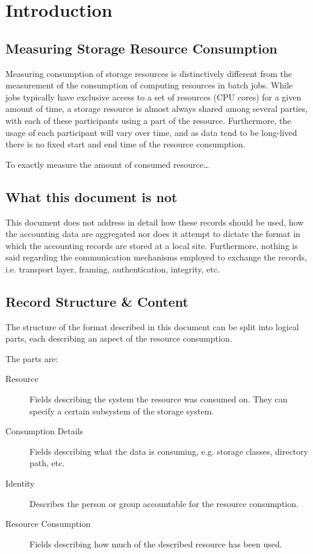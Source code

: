 \section{Introduction}

\subsection{Measuring Storage Resource Consumption}

Measuring consumption of storage resources is distinctively different from
the measurement of the consumption of computing resources in batch jobs. 
While jobs typically have exclusive access
to a set of resources (CPU cores) for a given amount of time, a storage
resource is almost always shared
among several parties, with each of these participants using a part of the
resource. Furthermore, the usage of each participant will vary over time, and as
data tend to be long-lived there is no fixed start and end time of the resource
consumption.

To exactly measure the amount of consumed resource\ldots

\subsection{What this document is not}
This document does not address in detail how these records should be used, 
how the accounting data are aggregated 
nor does it attempt to dictate the format in which the accounting records are 
stored at a local site. 
Furthermore, nothing is said regarding the communication mechanisms
employed to exchange the records, i.e. transport layer, framing, 
authentication, integrity, etc.


\subsection{Record Structure \& Content}

The structure of the format described in this document can be split into
logical parts, each describing an aspect of the resource consumption.

The parts are:

\begin{description}

\item[Resource] Fields describing the system the resource was consumed on. They 
can specify a certain subsystem of the storage system.

\item[Consumption Details] Fields describing what the data is consuming, e.g. 
storage classes, directory path, etc.

\item[Identity] Describes the person or group accountable for the resource
consumption.

\item[Resource Consumption] Fields describing how much of the described
resource has been used.

\end{description}

